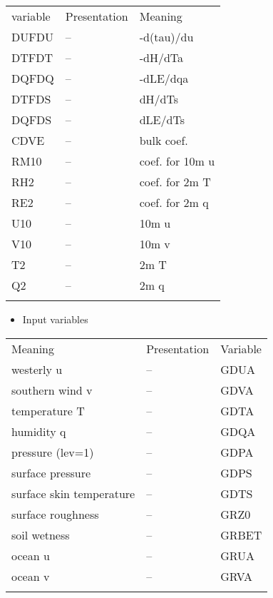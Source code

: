 \setlength\LTleft{0pt}\setlength\LTright{0pt}\begin{longtable}[]{@{}lll@{}}
\toprule\relax
variable & Presentation & Meaning \\ \addlinespace
\midrule\relax
\endhead
DUFDU & -- & -d(tau)/du \\ \addlinespace
DTFDT & -- & -dH/dTa \\ \addlinespace
DQFDQ & -- & -dLE/dqa \\ \addlinespace
DTFDS & -- & dH/dTs \\ \addlinespace
DQFDS & -- & dLE/dTs \\ \addlinespace
CDVE & -- & bulk coef. \\ \addlinespace
RM10 & -- & coef. for 10m u \\ \addlinespace
RH2 & -- & coef. for 2m T \\ \addlinespace
RE2 & -- & coef. for 2m q \\ \addlinespace
U10 & -- & 10m u \\ \addlinespace
V10 & -- & 10m v \\ \addlinespace
T2 & -- & 2m T \\ \addlinespace
Q2 & -- & 2m q \\ \addlinespace
\bottomrule
\end{longtable}

\begin{itemize}
\tightlist
\item
  Input variables
\end{itemize}

\setlength\LTleft{0pt}\setlength\LTright{0pt}\begin{longtable}[]{@{}lll@{}}
\toprule\relax
Meaning & Presentation & Variable \\ \addlinespace
\midrule\relax
\endhead
westerly u & -- & GDUA \\ \addlinespace
southern wind v & -- & GDVA \\ \addlinespace
temperature T & -- & GDTA \\ \addlinespace
humidity q & -- & GDQA \\ \addlinespace
pressure (lev=1) & -- & GDPA \\ \addlinespace
surface pressure & -- & GDPS \\ \addlinespace
surface skin temperature & -- & GDTS \\ \addlinespace
surface roughness & -- & GRZ0 \\ \addlinespace
soil wetness & -- & GRBET \\ \addlinespace
ocean u & -- & GRUA \\ \addlinespace
ocean v & -- & GRVA \\ \addlinespace
\bottomrule
\end{longtable}

